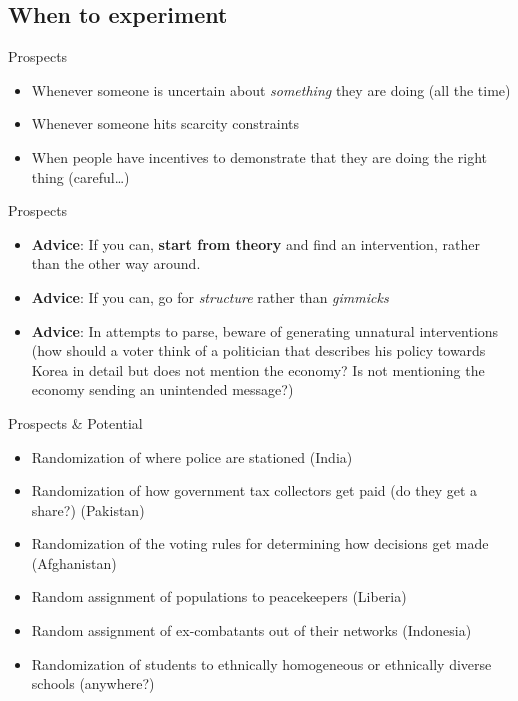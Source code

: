 \documentclass[
  11pt,
  ignorenonframetext,
]{beamer}
\providecommand{\tightlist}{%
  \setlength{\itemsep}{0pt}\setlength{\parskip}{0pt}}\usepackage{longtable,booktabs,array}
\begin{document}
\hypertarget{when-to-experiment}{%
\subsection{\texorpdfstring{When to experiment
\label{L_prospects}}{When to experiment }}\label{when-to-experiment}}

\begin{frame}{Prospects}
\protect\hypertarget{prospects}{}
\begin{itemize}
\tightlist
\item
  Whenever someone is uncertain about \emph{something} they are doing
  (all the time)
\item
  Whenever someone hits scarcity constraints
\item
  When people have incentives to demonstrate that they are doing the
  right thing (careful\ldots)
\end{itemize}
\end{frame}

\begin{frame}{Prospects}
\protect\hypertarget{prospects-1}{}
\begin{itemize}
\tightlist
\item
  \textbf{Advice}: If you can, \textbf{start from theory} and find an
  intervention, rather than the other way around.
\item
  \textbf{Advice}: If you can, go for \emph{structure} rather than
  \emph{gimmicks}
\item
  \textbf{Advice}: In attempts to parse, beware of generating unnatural
  interventions (how should a voter think of a politician that describes
  his policy towards Korea in detail but does not mention the economy?
  Is not mentioning the economy sending an unintended message?)
\end{itemize}
\end{frame}

\begin{frame}{Prospects \& Potential}
\protect\hypertarget{prospects-potential}{}
\begin{itemize}
\tightlist
\item
  Randomization of where police are stationed (India)
\item
  Randomization of how government tax collectors get paid (do they get a
  share?) (Pakistan)
\item
  Randomization of the voting rules for determining how decisions get
  made (Afghanistan)
\item
  Random assignment of populations to peacekeepers (Liberia)
\item
  Random assignment of ex-combatants out of their networks (Indonesia)
\item
  Randomization of students to ethnically homogeneous or ethnically
  diverse schools (anywhere?)
\end{itemize}
\end{frame}
\end{document}
